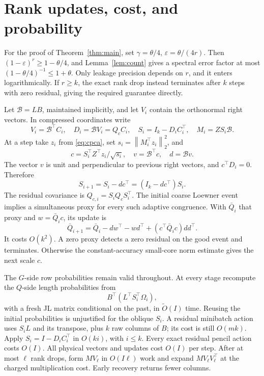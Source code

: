 \documentclass[11pt]{article}
\newcommand{\norm}[1]{\left\lVert#1\right\rVert}
\begin{document}
\section{Rank updates, cost, and probability}
For the proof of Theorem~\ref{thm:main}, set
\(\gamma=\theta/4\), \(\varepsilon=\theta/(4r)\).
Then \((1-\varepsilon)^r\geq1-\theta/4\), and Lemma~\ref{lem:count}
gives a spectral error factor at most
\((1-\theta/4)^{-1}\leq1+\theta\).
Only leakage precision depends on \(r\), and it enters logarithmically.
If \(r\geq k\), the exact rank drop instead terminates after \(k\)
steps with zero residual, giving the required guarantee directly.

Let \(\mathcal B=LB\), maintained implicitly, and let \(V_i\) contain
the orthonormal right vectors. In compressed coordinates write
\[
 V_i=\mathcal B^\top C_i,\quad
 D_i=\mathcal BV_i=Q_c C_i,\quad
 S_i=I_k-D_iC_i^\top,\quad
 M_i=Z S_i\mathcal B.
\]
At a step take \(z_i\) from \eqref{eq:cpca}, set
\(s_i=\norm{M_i^\top z_i}_2^2\), and
\[
 c=S_i^\top Z^\top z_i/\sqrt{s_i},\quad
 v=\mathcal B^\top c,\quad d=\mathcal Bv.
\]
The vector \(v\) is unit and perpendicular to previous right vectors,
and \(c^\top D_i=0\). Therefore
\[
 S_{i+1}=S_i-dc^\top=(I_k-dc^\top)S_i.
\]
The residual covariance is \(Q_{c,i}=S_iQ_cS_i^\top\).
The initial coarse Loewner event implies a simultaneous proxy for
every such adaptive congruence. With \(\bar Q_i\) that proxy and
\(w=\bar Q_i c\), its update is
\[
 \bar Q_{i+1}=\bar Q_i-dw^\top-wd^\top
                     +(c^\top\bar Q_i c)dd^\top .
\]
It costs \(O(k^2)\). A zero proxy detects a zero residual on the good
event and terminates. Otherwise the constant-accuracy small-core norm
estimate gives the next scale \(c\).

The \(G\)-side row probabilities remain valid throughout.
At every stage recompute the \(Q\)-side length probabilities from
\[
 B^\top(L^\top S_i^\top\Omega_i),
\]
with a fresh JL matrix conditional on the past, in
\(\widetilde O(I)\) time. Reusing the initial probabilities is
unjustified for the oblique \(S_i\).
A residual minibatch action uses \(S_iL\) and its transpose, plus
\(k\) raw columns of \(B\); its cost is still \(O(mk)\).
Apply \(S_i=I-D_iC_i^\top\) in \(O(ki)\), with \(i\leq k\).
Every exact residual pencil action costs \(O(I)\).
All physical vectors and updates cost \(O(I)\) per step.
After at most \(\ell\) rank drops, form \(MV_\ell\) in \(O(I\ell)\)
work and expand \(MV_\ell V_\ell^\top\) at the charged multiplication
cost. Early recovery returns fewer columns.
\end{document}
